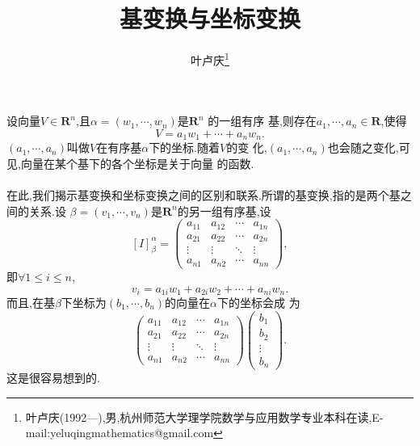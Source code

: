 \documentclass[a4paper]{article}
\begin{document}
\title{\huge{\bf{基变换与坐标变换}}} \author{\small{叶卢庆\footnote{叶卢庆(1992---),男,杭州师范大学理学院数学与应用数学专业本科在读,E-mail:yeluqingmathematics@gmail.com}}}
\maketitle
设向量$V\in \mathbf{R}^n$,且$\alpha=(w_1,\cdots,w_n)$是$\mathbf{R}^n$
的一组有序
基,则存在$a_1,\cdots,a_n\in \mathbf{R}$,使得
$$
V=a_1w_1+\cdots+a_nw_n.
$$
$(a_1,\cdots,a_n)$叫做$V$在有序基$\alpha$下的坐标.随着$V$的变
化,$(a_1,\cdots,a_n)$也会随之变化,可见,向量在某个基下的各个坐标是关于向量
的函数.\\\\

在此,我们揭示基变换和坐标变换之间的区别和联系.所谓的基变换,指的是两个基之间的关系.设
$\beta=(v_1,\cdots,v_n)$是$\mathbf{R}^n$的另一组有序基,设
$$
[I]_{\beta}^{\alpha}=
\begin{pmatrix}
  a_{11}&a_{12}&\cdots&a_{1n}\\
  a_{21}&a_{22}&\cdots&a_{2n}\\
  \vdots&\vdots&\ddots&\vdots\\
a_{n1}&a_{n2}&\cdots&a_{nn}
\end{pmatrix},
$$
即$\forall 1\leq i\leq n$,
$$
v_i=a_{1i}w_1+a_{2i}w_2+\cdots+a_{ni}w_n.
$$
而且,在基$\beta$下坐标为$(b_1,\cdots,b_n)$的向量在$\alpha$下的坐标会成
为
$$
\begin{pmatrix}
  a_{11}&a_{12}&\cdots&a_{1n}\\
  a_{21}&a_{22}&\cdots&a_{2n}\\
  \vdots&\vdots&\ddots&\vdots\\
a_{n1}&a_{n2}&\cdots&a_{nn}
\end{pmatrix}
\begin{pmatrix}
  b_1\\
b_2\\
\vdots\\
b_n
\end{pmatrix}.
$$
这是很容易想到的.
\end{document}
